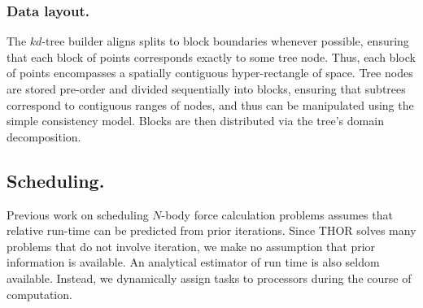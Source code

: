 \documentclass[twoside,leqno,twocolumn]{article}
\newcommand{\authornote}[1]{(\footnote{Note to self: #1})}
\newcommand{\authorsnote}[1]{\authornote{#1}}
\newcommand{\mysubsub}[1]{\subsubsection{#1.}}
\newcommand{\mysub}[1]{\subsection{#1.}}
\begin{document}


\mysubsub{Data layout}
The $kd$-tree builder aligns splits to block boundaries whenever possible, ensuring that each block of points corresponds exactly to some tree node.
Thus, each block of points encompasses a spatially contiguous hyper-rectangle of space.
Tree nodes are stored pre-order and divided sequentially into blocks, ensuring that subtrees correspond to contiguous ranges of nodes, and thus can be manipulated using the simple consistency model.
Blocks are then distributed via the tree's domain decomposition.

\mysub{Scheduling}
Previous work \cite{salmon_thesis, singh_thesis} on scheduling $N$-body force calculation problems assumes that relative run-time can be predicted from prior iterations.
Since THOR solves many problems that do not involve iteration, we make no assumption that prior information is available.
An analytical estimator of run time is also seldom available.
Instead, we dynamically assign tasks to processors during the course of computation.

\end{document}
